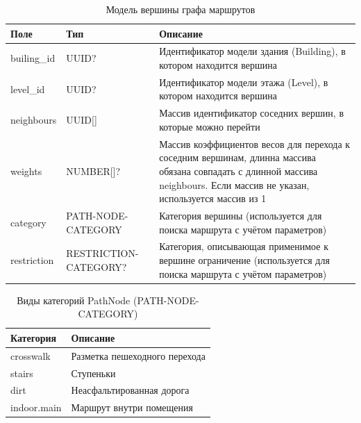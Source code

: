           \begin{center}
            \begin{xltabular}{\linewidth}{|l|p{4cm}|X|}
              \caption{Модель вершины графа маршрутов}\\\hline
              Поле        & Тип                   & Описание                                                                                                                                                                    \\ \hline
              builing\_id & UUID?                 & Идентификатор модели здания (Building), в котором находится вершина                                                                                                          \\ \hline
              level\_id   & UUID?                 & Идентификатор модели этажа (Level), в котором находится вершина                                                                                                              \\ \hline
              neighbours  & UUID[]                & Массив идентификатор соседних вершин, в которые можно перейти                                                                                                                \\ \hline
              weights     & NUMBER[]?             & Массив коэффициентов весов для перехода к соседним вершинам, длинна массива обязана совпадать с длинной массива neighbours. Если массив не указан, используется массив из 1 \\ \hline
              category    & PATH-NODE-CATEGORY    & Категория вершины (используется для поиска маршрута с учётом параметров)                                                                                                    \\ \hline
              restriction & RESTRICTION-CATEGORY? & Категория, описывающая применимое к вершине ограничение (используется для поиска маршрута с учётом параметров)                                                               \\ \hline
            \end{xltabular}
          \end{center}

          \begin{center}
            \begin{xltabular}{\linewidth}{|l|X|}
              \caption{Виды категорий PathNode (PATH-NODE-CATEGORY)}\\             \hline
              Категория   & Описание                      \\ \hline
              crosswalk   & Разметка пешеходного перехода \\ \hline
              stairs      & Ступеньки                     \\ \hline
              dirt        & Неасфальтированная дорога     \\ \hline
              indoor.main & Маршрут внутри помещения      \\ \hline
            \end{xltabular}
          \end{center}


